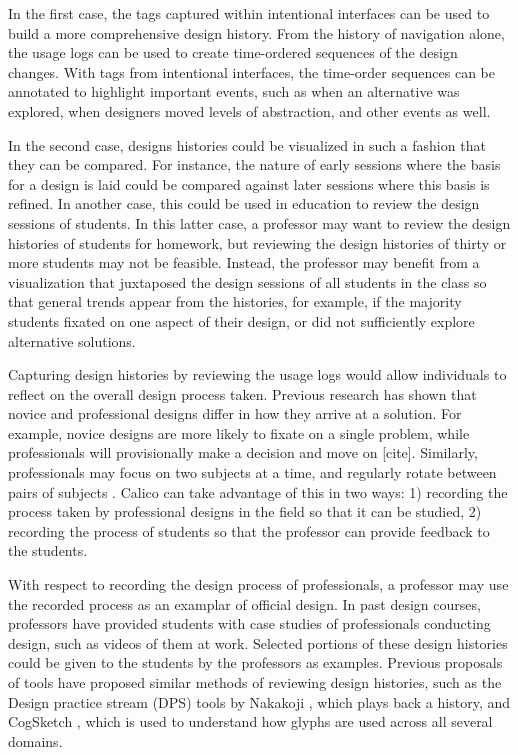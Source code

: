 \documentclass[12pt,fleqn]{ucithesis}
\begin{document}
In the first case, the tags captured within intentional interfaces can be used to build a more comprehensive design history. From the history of navigation alone, the usage logs can be used to create time-ordered sequences of the design changes. With tags from intentional interfaces, the time-order sequences can be annotated to highlight important events, such as when an alternative was explored, when designers moved levels of abstraction, and other events as well. 

In the second case, designs histories could be visualized in such a fashion that they can be compared. For instance, the nature of early sessions where the basis for a design is laid could be compared against later sessions where this basis is refined. In another case, this could be used in education to review the design sessions of students. In this latter case, a professor may want to review the design histories of students for homework, but reviewing the design histories of thirty or more students may not be feasible. Instead, the professor may benefit from a visualization that juxtaposed the design sessions of all students in the class so that general trends appear from the histories, for example, if the majority students fixated on one aspect of their design, or did not sufficiently explore alternative solutions.

Capturing design histories by reviewing the usage logs would allow individuals to reflect on the overall design process taken. Previous research has shown that novice and professional designs differ in how they arrive at a solution. For example, novice designs are more likely to fixate on a single problem, while professionals will provisionally make a decision and move on [cite]. Similarly, professionals may focus on two subjects at a time, and regularly rotate between pairs of subjects \cite{Baker2010590}. 
Calico can take advantage of this in two ways: 1) recording the process taken by professional designs in the field so that it can be studied, 2) recording the process of students so that the professor can provide feedback to the students.

With respect to recording the design process of professionals, a professor may use the recorded process as an examplar of official design. In past design courses, professors have provided students with case studies of professionals conducting design, such as videos of them at work. Selected portions of these design histories could be given to the students by the professors as examples. Previous proposals of tools have proposed similar methods of reviewing design histories, such as the Design practice stream (DPS) tools by Nakakoji \cite{Nakakoji6035659}, which plays back a history, and CogSketch \cite{Forbus1149}, which is used to understand how glyphs are used across all several domains.
\end{document}
